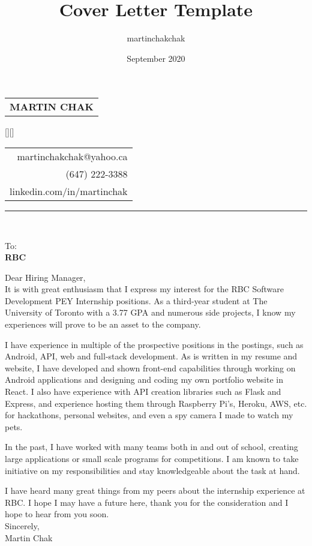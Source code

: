 \documentclass[12pt,letterpaper]{article}
\title{Cover Letter Template}
\author{martinchakchak }
\date{September 2020}
\begin{document}
\noindent
\begin{spacing}{1.125}
    \vfill\noindent
    \begin{tabular}[t]{@{}l} 
      \MakeUppercase{\fontsize{18pt}{5pt}\bf Martin Chak}
    \end{tabular}
    \hfill
    \hspace*{7.5cm}
    \raisebox{0.15cm}[\height][\depth]{
        \begin{tabular}[t]{r}
            martinchakchak@yahoo.ca\\
            (647) 222-3388\\
            linkedin.com/in/martinchak
        \end{tabular}
    }
\end{spacing}

\hrule



\noindent\\

\noindent
{\fontsize{10pt}{5pt}To:}\\
{\bf RBC}\\

\begin{text}
    Dear Hiring Manager,\\
    
    It is with great enthusiasm that I express my interest for the RBC Software Development PEY Internship positions. As a third-year student at The University of Toronto with a 3.77 GPA and numerous side projects, I know my experiences will prove to be an asset to the company.
    
    I have experience in multiple of the prospective positions in the postings, such as Android, API, web and full-stack development. As is written in my resume and website, I have developed and shown front-end capabilities through working on Android applications and designing and coding my own portfolio website in React. I also have experience with API creation libraries such as Flask and Express, and experience hosting them through Raspberry Pi's, Heroku, AWS, etc. for hackathons, personal websites, and even a spy camera I made to watch my pets.
    
    In the past, I have worked with many teams both in and out of school, creating large applications or small scale programs for competitions. I am known to take initiative on my responsibilities and stay knowledgeable about the task at hand.
    
    I have heard many great things from my peers about the internship experience at RBC. I hope I may have a future here, thank you for the consideration and I hope to hear from you soon.\\
    
    Sincerely,\\
    Martin Chak
\end{text}
\end{document}
